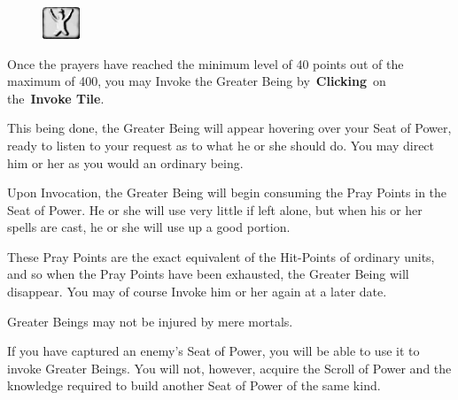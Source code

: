 \begin{figure}
	\vspace{-20pt}
	\begin{center}
		\includegraphics[width=0.1\textwidth]{Tinvoke}
	\end{center}
	\vspace{-20pt}
\end{figure}


Once the prayers have reached the minimum level of 40 points out of the maximum of 400, you may Invoke the Greater Being by \textbf{Clicking} on the \textbf{Invoke Tile}.

This being done, the Greater Being will appear hovering over your Seat of Power, ready to listen to your request as to what he or she should do. You may direct him or her as you would an ordinary being.

Upon Invocation, the Greater Being will begin consuming the Pray Points in the Seat of Power. He or she will use very little if left alone, but when his or her spells are cast, he or she will use up a good portion.

These Pray Points are the exact equivalent of the Hit-Points of ordinary units, and so when the Pray Points have been exhausted, the Greater Being will disappear. You may of course Invoke him or her again at a later date.

Greater Beings may not be injured by mere mortals.

If you have captured an enemy’s Seat of Power, you will be able to use it to invoke Greater Beings. You will not, however, acquire the Scroll of Power and the knowledge required to build another Seat of Power of the same kind.
